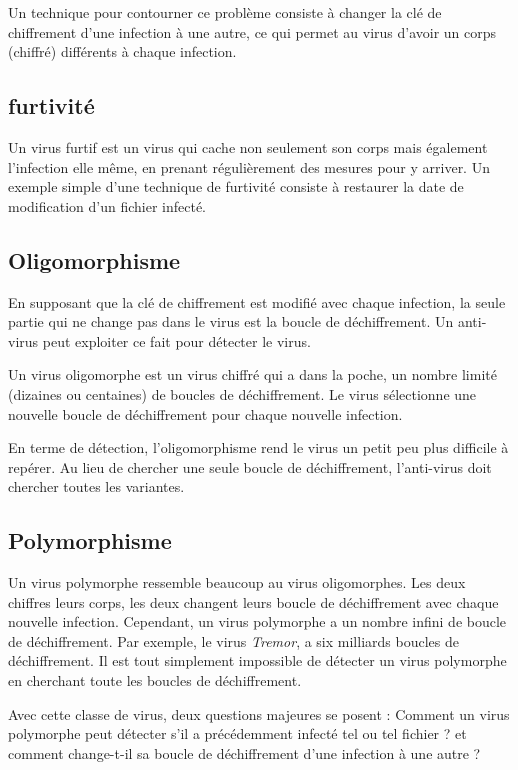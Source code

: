     Un technique pour contourner ce problème consiste à changer la clé de chiffrement d'une infection à une autre, ce
    qui permet au virus d'avoir un corps (chiffré) différents à chaque infection.

    \subsection{furtivité}
    Un virus furtif est un virus qui cache non seulement son corps mais également l'infection elle même,
    en prenant régulièrement des mesures pour y arriver. 
    Un exemple simple d'une technique de furtivité consiste à restaurer la date de modification d'un fichier infecté.

    \subsection{Oligomorphisme}
    En supposant que la clé de chiffrement est modifié avec chaque infection, la seule partie qui ne change pas
    dans le virus est la boucle de déchiffrement. Un anti-virus peut exploiter ce fait pour détecter le virus. 

    Un virus oligomorphe est un virus chiffré qui a dans la poche, un nombre limité (dizaines ou centaines) 
    de boucles de déchiffrement. Le virus sélectionne une nouvelle boucle de déchiffrement 
    pour chaque nouvelle infection.

    En terme de détection, l'oligomorphisme rend le virus un petit peu plus difficile à repérer. Au lieu de chercher
    une seule boucle de déchiffrement, l'anti-virus doit chercher toutes les variantes. \cite{virus}

    \subsection{Polymorphisme}
    Un virus polymorphe ressemble beaucoup au virus oligomorphes. Les deux chiffres leurs corps, les deux changent leurs
    boucle de déchiffrement avec chaque nouvelle infection. Cependant, un virus polymorphe a un nombre infini de 
    boucle de déchiffrement. Par exemple, le virus \emph{Tremor}, a six milliards boucles de déchiffrement. Il est
    tout simplement impossible de détecter un virus polymorphe en cherchant toute les boucles de déchiffrement.

    Avec cette classe de virus, deux questions majeures se posent : Comment un virus polymorphe peut détecter
    s'il a précédemment infecté tel ou tel fichier ? et comment change-t-il sa boucle de déchiffrement d'une infection
    à une autre ?
